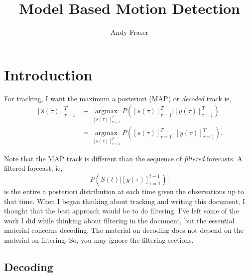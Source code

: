 \documentclass[12pt]{article}
\title{Model Based Motion Detection}
\author{Andy Fraser}
\newcommand{\os}[4]{{\left[ #1(#2) \right]}_{#3}^{#4}} %
\newcommand{\ts}[4]{\os{#1}{#2}{#2=#3}{#4}} %
\newcommand{\argmax}{\operatorname*{argmax}}
\begin{document}
\maketitle

\section{Introduction}
\label{sec:introduction}

For tracking, I want the maximum a posteriori (MAP) or \emph{decoded}
track ie,
\begin{align*}
  \ts{\hat s}{\tau}{1}{T} &\equiv \argmax_{\ts{s}{\tau}{1}{T}}
  P(\ts{s}{\tau}{1}{T}|\ts{y}{\tau}{1}{T}) \\
  &= \argmax_{\ts{s}{\tau}{1}{T}} P(\ts{s}{\tau}{1}{T},\ts{y}{\tau}{1}{T}).
\end{align*}

Note that the MAP track is different than the sequence of
\emph{filtered} forecasts.  A filtered forecast, ie,
\begin{equation*}
  P(S(t)|\ts{y}{\tau}{1}{t-1}).
\end{equation*}
is the entire a posteriori distribution at each time given the
observations up to that time.  When I began thinking about tracking
and writing this document, I thought that the best approach would be
to do filtering.  I've left some of the work I did while thinking
about filtering in the document, but the essential material concerns
decoding.  The material on decoding does not depend on the material on
filtering.  So, you may ignore the filtering sections.

\subsection{Decoding}
\label{sec:decoding}
\end{document}
